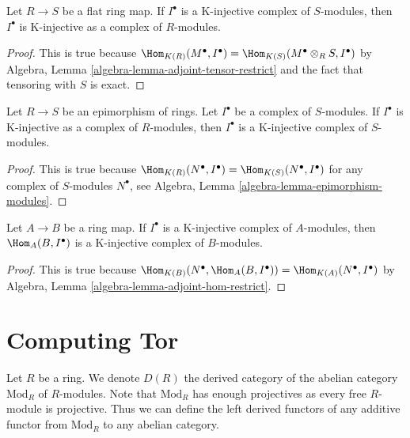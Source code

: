 \begin{lemma}
\label{lemma-K-injective-flat}
Let $R \to S$ be a flat ring map. If $I^\bullet$ is a K-injective
complex of $S$-modules, then $I^\bullet$ is K-injective as a
complex of $R$-modules.
\end{lemma}

\begin{proof}
This is true because
$\Hom_{K(R)}(M^\bullet, I^\bullet) =
\Hom_{K(S)}(M^\bullet \otimes_R S, I^\bullet)$
by Algebra, Lemma \ref{algebra-lemma-adjoint-tensor-restrict}
and the fact that tensoring with $S$ is exact.
\end{proof}

\begin{lemma}
\label{lemma-K-injective-epimorphism}
Let $R \to S$ be an epimorphism of rings. Let $I^\bullet$ be a complex
of $S$-modules. If $I^\bullet$ is K-injective as a complex of
$R$-modules, then $I^\bullet$ is a K-injective complex of $S$-modules.
\end{lemma}

\begin{proof}
This is true because
$\Hom_{K(R)}(N^\bullet, I^\bullet) =
\Hom_{K(S)}(N^\bullet, I^\bullet)$ for any complex of $S$-modules
$N^\bullet$,
see Algebra, Lemma \ref{algebra-lemma-epimorphism-modules}.
\end{proof}

\begin{lemma}
\label{lemma-hom-K-injective}
Let $A \to B$ be a ring map. If $I^\bullet$ is a K-injective complex of
$A$-modules, then $\Hom_A(B, I^\bullet)$ is a K-injective complex of
$B$-modules.
\end{lemma}

\begin{proof}
This is true because
$\Hom_{K(B)}(N^\bullet, \Hom_A(B, I^\bullet)) =
\Hom_{K(A)}(N^\bullet, I^\bullet)$
by Algebra, Lemma \ref{algebra-lemma-adjoint-hom-restrict}.
\end{proof}










\section{Computing Tor}
\label{section-computing-tor}

\noindent
Let $R$ be a ring. We denote $D(R)$ the derived category of the
abelian category $\text{Mod}_R$ of $R$-modules. Note that $\text{Mod}_R$
has enough projectives as every free $R$-module is projective.
Thus we can define the left derived functors of any additive functor
from $\text{Mod}_R$ to any abelian category.

